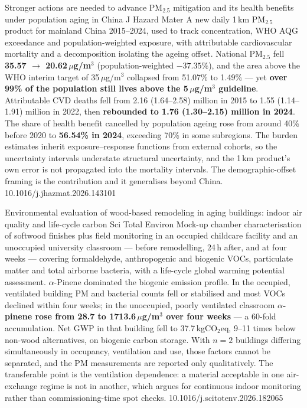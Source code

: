 \documentclass[10pt]{article}
\begin{document}
{Stronger actions are needed to advance PM$_{2.5}$ mitigation and its health benefits
under population aging in China}
{J Hazard Mater}
{A new daily 1\,km PM$_{2.5}$ product for mainland China 2015--2024, used to track
concentration, WHO AQG exceedance and population-weighted exposure, with attributable
cardiovascular mortality and a decomposition isolating the ageing offset. National
PM$_{2.5}$ fell \textbf{35.57 $\rightarrow$ 20.62\,$\mu$g/m$^3$} (population-weighted
$-37.35\%$), and the area above the WHO interim target of 35\,$\mu$g/m$^3$ collapsed from
51.07\% to 1.49\% --- yet \textbf{over 99\% of the population still lives above the
5\,$\mu$g/m$^3$ guideline}. Attributable CVD deaths fell from 2.16 (1.64--2.58) million
in 2015 to 1.55 (1.14--1.91) million in 2022, then \textbf{rebounded to 1.76 (1.30--2.15)
million in 2024}. The share of health benefit cancelled by population ageing rose from
around 40\% before 2020 to \textbf{56.54\% in 2024}, exceeding 70\% in some subregions.
The burden estimates inherit exposure--response functions from external cohorts, so the
uncertainty intervals understate structural uncertainty, and the 1\,km product's own
error is not propagated into the mortality intervals. The demographic-offset framing is
the contribution and it generalises beyond China.}
{10.1016/j.jhazmat.2026.143101}


{Environmental evaluation of wood-based remodeling in aging buildings: indoor air quality
and life-cycle carbon}
{Sci Total Environ}
{Mock-up chamber characterisation of softwood finishes plus field monitoring in an
occupied childcare facility and an unoccupied university classroom --- before
remodelling, 24\,h after, and at four weeks --- covering formaldehyde, anthropogenic and
biogenic VOCs, particulate matter and total airborne bacteria, with a life-cycle global
warming potential assessment. $\alpha$-Pinene dominated the biogenic emission profile.
In the occupied, ventilated building PM and bacterial counts fell or stabilised and most
VOCs declined within four weeks; in the unoccupied, poorly ventilated classroom
\textbf{$\alpha$-pinene rose from 28.7 to 1713.6\,$\mu$g/m$^3$ over four weeks} --- a
60-fold accumulation. Net GWP in that building fell to 37.7\,kgCO$_2$eq, 9--11 times
below non-wood alternatives, on biogenic carbon storage. With $n = 2$ buildings differing
simultaneously in occupancy, ventilation and use, those factors cannot be separated, and
the PM measurements are reported only qualitatively. The transferable point is the
ventilation dependence: a material acceptable in one air-exchange regime is not in
another, which argues for continuous indoor monitoring rather than commissioning-time
spot checks.}
{10.1016/j.scitotenv.2026.182065}
\end{document}

